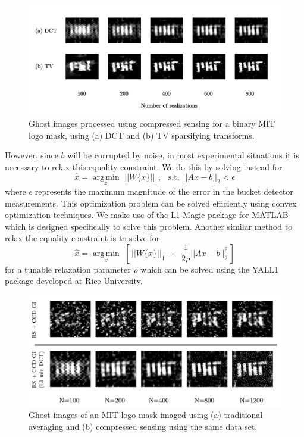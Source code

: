 \begin{figure}[t]
\begin{center}
\includegraphics[width=16cm]{figure-ghost-compressed-dctvstv.pdf}
\caption{Ghost images processed using compressed sensing for a binary MIT logo mask, using (a) DCT and (b) TV sparsifying transforms.}
\label{figure:ghost-compressed-dctvstv}
\end{center}
\end{figure}


However, since $b$ will be corrupted by noise, in most experimental situations it is necessary to relax this equality constraint. We do this by solving instead for
\begin{equation}
\hat{x} = \underset{x}{\operatorname{arg\,min}}\,\,||W\{x\}||_1,\,\,\, \operatorname{s.t.}\,||Ax - b||_2<\epsilon
\end{equation}
where $\epsilon$ represents the maximum magnitude of the error in the bucket detector measurements. This optimization problem can be solved efficiently using convex optimization techniques. We make use of the L1-Magic \cite{l1magic} package for MATLAB which is designed specifically to solve this problem. Another similar method to relax the equality constraint is to solve for
\begin{equation}
\hat{x} = \underset{x}{\operatorname{arg\,min}}\,\,\left[\,||W\{x\}||_1\,\,+\,\,\frac{1}{2\rho}||Ax - b||_2^2\,\right]
\end{equation}
for a tunable relaxation parameter $\rho$ which can be solved using the YALL1 package \cite{yall1} developed at Rice University.

\begin{figure}[t]
\begin{center}
\includegraphics[width=16cm]{figure-ghost-compressed-bszl1.pdf}
\caption{Ghost images of an MIT logo mask imaged using (a) traditional averaging and (b) compressed sensing using the same data set.}
\label{figure:ghost-compressed-bszl1}
\end{center}
\end{figure}


